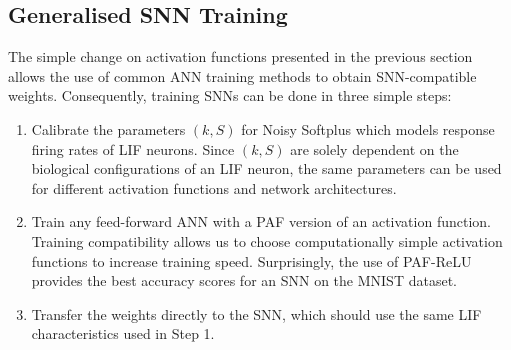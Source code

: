 \documentclass{article}
\begin{document}
	\subsection{Generalised SNN Training}
	\label{subsec:ns_train}

	The simple change on activation functions presented in the previous section allows the use of common ANN training methods to obtain SNN-compatible weights.
	Consequently, training SNNs can be done in three simple steps: 
	\begin{enumerate}
		\item Calibrate the parameters $(k, S)$ for Noisy Softplus which models response firing rates of LIF neurons. Since $(k, S)$ are solely dependent on the biological configurations of an LIF neuron, the same parameters can be used for different activation functions and network architectures.
		\item Train any feed-forward ANN with a PAF version of an activation function. Training compatibility allows us to choose computationally simple activation functions to increase training speed. Surprisingly, the use of PAF-ReLU provides the best accuracy scores for an SNN on the MNIST dataset. 
		\item Transfer the weights directly to the SNN, which should use the same LIF characteristics used in Step 1.
	\end{enumerate}

	
	
	
	
\end{document}
